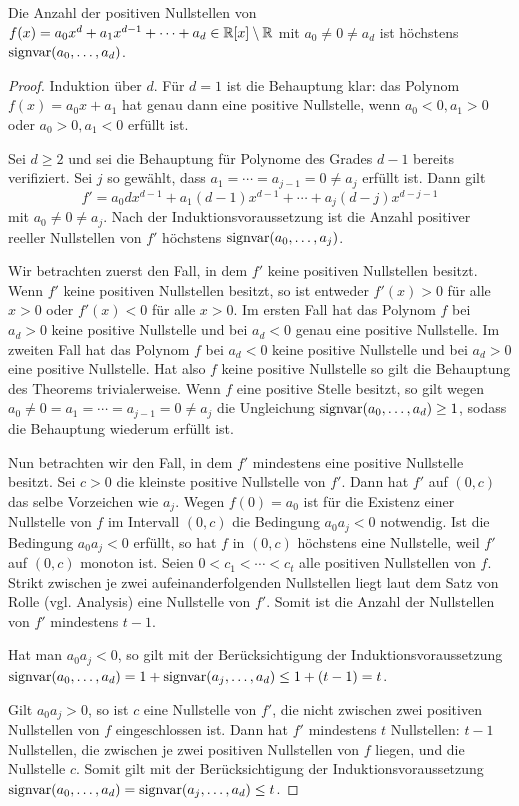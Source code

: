 \documentclass[11pt]{article}
\numberwithin{equation}{section}
\begin{document}
\begin{theorem}
	Die Anzahl der positiven Nullstellen von $f(x) = a_0 x^d + a_1 x^{d-1} + \cdots + a_d \in \mathbb{R}[x] \setminus \mathbb{R}$ mit $a_0 \ne 0 \ne a_d$ ist höchstens $\operatorname{signvar}(a_0,\ldots,a_d)$. 
\end{theorem} 
\begin{proof} 
	Induktion über $d$. Für $d=1$ ist die Behauptung klar: das Polynom $f(x) = a_0 x + a_1$ hat genau dann eine positive Nullstelle, wenn $a_0<0,a_1>0$ oder $a_0>0, a_1 < 0$ erfüllt ist. 
	
	
	Sei $d \ge 2$ und sei die Behauptung für Polynome des Grades $d-1$ bereits verifiziert.
	Sei $j$ so gewählt, dass $a_1 = \cdots = a_{j-1} = 0 \ne a_j$ erfüllt ist. Dann gilt 
	 \[
	 	f' = a_0 d x^{d-1} + a_1 (d-1) x^{d-1} + \cdots + a_j (d-j) x^{d-j-1}
	 \] mit $a_0 \ne 0 \ne a_j$. Nach der Induktionsvoraussetzung ist die Anzahl positiver reeller Nullstellen von $f'$  höchstens $\operatorname{signvar}(a_0,\ldots,a_j)$. 
	 
	 Wir betrachten zuerst den Fall, in dem $f'$ keine positiven Nullstellen besitzt. Wenn $f'$ keine positiven Nullstellen besitzt, so ist entweder $f'(x) > 0$ für alle $x> 0$ oder $f'(x) < 0$ für alle $x>0$. Im ersten Fall hat das Polynom $f$ bei $a_d > 0$ keine positive Nullstelle und bei $a_d<0$ genau eine positive Nullstelle. Im zweiten Fall hat das Polynom $f$ bei $a_d<0$ keine positive Nullstelle und bei $a_d >0$ eine positive Nullstelle. Hat also $f$ keine positive Nullstelle so gilt die Behauptung des Theorems trivialerweise. Wenn $f$ eine positive Stelle besitzt, so gilt wegen $a_0  \ne 0 = a_1 = \cdots = a_{j-1} = 0 \ne a_j$ die Ungleichung $\operatorname{signvar}(a_0,\ldots,a_d) \ge 1$, sodass die Behauptung wiederum erfüllt ist. 
	 
	 Nun betrachten wir den Fall, in dem $f'$ mindestens eine positive Nullstelle besitzt. 	 Sei $c>0$ die kleinste positive Nullstelle von $f'$. Dann hat $f'$ auf $(0,c)$ das selbe Vorzeichen wie $a_j$. Wegen $f(0)= a_0$ ist für die Existenz einer Nullstelle von $f$ im Intervall $(0,c)$ die Bedingung $a_0 a_j < 0$ notwendig. Ist die Bedingung $a_0 a_j < 0$ erfüllt, so hat $f$ in $(0,c)$ höchstens eine Nullstelle, weil $f'$ auf $(0,c)$ monoton ist. Seien $0 < c_1 <  \cdots < c_t$ alle positiven Nullstellen von $f$. Strikt zwischen je zwei aufeinanderfolgenden Nullstellen liegt laut dem Satz von Rolle (vgl. Analysis) eine Nullstelle von $f'$. Somit ist die Anzahl der Nullstellen von $f'$ mindestens $t-1$. 
	 
	 Hat man $a_0 a_j < 0$, so gilt mit der Berücksichtigung der Induktionsvoraussetzung $\operatorname{signvar}(a_0,\ldots, a_d) = 1 + \operatorname{signvar}(a_j,\ldots,a_d) \le 1 + (t-1) = t$. 
	 
	 Gilt $a_0 a_j > 0$, so ist $c$ eine Nullstelle von $f'$, die nicht zwischen zwei positiven Nullstellen von $f$ eingeschlossen ist. Dann hat $f'$ mindestens $t$ Nullstellen: $t-1$ Nullstellen, die zwischen je zwei positiven Nullstellen von $f$ liegen, und die Nullstelle $c$. Somit gilt mit der Berücksichtigung der Induktionsvoraussetzung $\operatorname{signvar}(a_0,\ldots,a_d) = \operatorname{signvar}(a_j,\ldots,a_d)  \le t$. 
\end{proof} 
\end{document}
